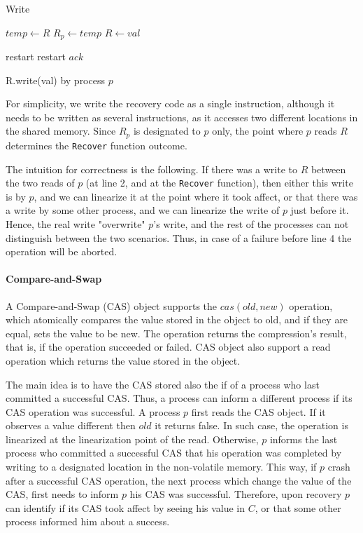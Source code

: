 \begin{algorithm}
	\caption{Write}\label{recoverable write}
	\begin{algorithmic}[1]	
		\State $temp \gets R$
		\State $R_p \gets temp$
		\State $R \gets val$
		\EndProcedure
		
		 \Return restart
		\EndIf
		 \Return restart
		\EndIf
		\Return $ack$
		\EndProcedure
	\end{algorithmic}
	\caption{R.write(val) by process $p$}
\end{algorithm}

For simplicity, we write the recovery code as a single instruction, although it needs to be written as several instructions, as it accesses two different locations in the shared memory. Since $R_p$ is designated to $p$ only, the point where $p$ reads $R$ determines the \texttt{Recover} function outcome.

The intuition for correctness is the following. If there was a write to $R$ between the two reads of $p$ (at line 2, and at the \texttt{Recover} function), then either this write is by $p$, and we can linearize it at the point where it took affect, or that there was a write by some other process, and we can linearize the write of $p$ just before it. Hence, the real write "overwrite" $p$'s write, and the rest of the processes can not distinguish between the two scenarios. Thus, in case of a failure before line 4 the operation will be aborted.


\paragraph*{Compare-and-Swap}

A Compare-and-Swap (CAS) object supports the $cas(old,new)$ operation, which atomically compares the value stored in the object to old, and if they are equal, sets the value to be new. The operation returns the compression's result, that is, if the operation succeeded or failed. CAS object also support a read operation which returns the value stored in the object.

The main idea is to have the CAS stored also the if of a process who last committed a successful CAS. Thus, a process can inform a different process if its CAS operation was successful.
A process $p$ first reads the CAS object. If it observes a value different then $old$ it returns false. In such case, the operation is linearized at the linearization point of the read. Otherwise, $p$ informs the last process who committed a successful CAS that his operation was completed by writing to a designated location in the non-volatile memory. This way, if $p$ crash after a successful CAS operation, the next process which change the value of the CAS, first needs to inform $p$ his CAS was successful. Therefore, upon recovery $p$ can identify if its CAS took affect by seeing his value in $C$, or that some other process informed him about a success.

